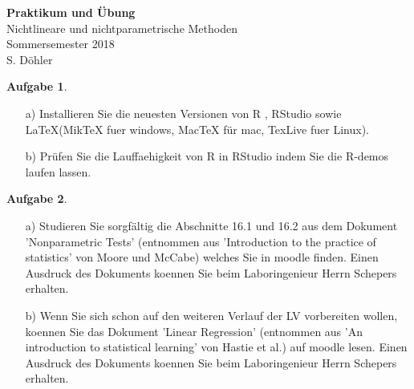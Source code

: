 \documentclass[]{article}
\title{}
\author{}
\date{}
\begin{document}
\theoremstyle{definition} \newtheorem{auf}{Aufgabe}

\newcommand{\R}{{\sffamily R} }
\newcommand{\RStudio}{{\sffamily RStudio} }
\newcommand{\RMarkdown}{{\sffamily R Markdown} }


\begin{centering}
\Huge
{\bf Praktikum und Übung}\\
\Large
Nichtlineare und nichtparametrische Methoden\\
\normalsize
Sommersemester 2018\\
S. Döhler\\
\end{centering}

\hrulefill

\setcounter{auf}{-2}

\begin{auf}
\begin{itemize}
    \item[a)] Installieren Sie die neuesten Versionen von \R,  \RStudio sowie \LaTeX (MikTeX fuer windows, MacTeX für mac, TexLive fuer Linux).
    \item[b)] Prüfen Sie die Lauffaehigkeit von \R in \RStudio indem Sie die R-demos laufen lassen.
\end{itemize}
\end{auf}

\vspace{1.5em}

\begin{auf}
\begin{itemize}
    \item[a)] Studieren Sie sorgfältig die Abschnitte 16.1 und 16.2 aus dem Dokument 'Nonparametric Tests' (entnommen aus 'Introduction to the practice of statistics' von Moore und McCabe) welches Sie in moodle finden.  Einen Ausdruck des Dokuments koennen Sie beim Laboringenieur Herrn Schepers erhalten.
    \item[b)] Wenn Sie sich schon auf den weiteren Verlauf der LV vorbereiten wollen, koennen Sie das Dokument 'Linear Regression' (entnommen aus 'An introduction to statistical learning' von Hastie et al.) auf moodle lesen. Einen Ausdruck des Dokuments koennen Sie beim Laboringenieur Herrn Schepers erhalten. 
\end{itemize}
\end{auf}
\end{document}
